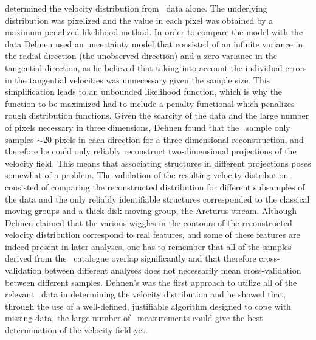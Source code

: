 \citet{1998AJ....115.2384D} determined the velocity distribution from
\Hipparcos\ data alone. The underlying distribution was pixelized and
the value in each pixel was obtained by a maximum penalized likelihood
method. In order to compare the model with the data Dehnen used an
uncertainty model that consisted of an infinite variance in the radial
direction (the unobserved direction) and a zero variance in the
tangential direction, as he believed that taking into account the
individual errors in the tangential velocities was unnecessary given
the sample size. This simplification leads to an unbounded likelihood
function, which is why the function to be maximized had to include a
penalty functional which penalizes rough distribution functions. Given
the scarcity of the data and the large number of pixels necessary in
three dimensions, Dehnen found that the \Hipparcos\ sample only
samples $\sim\!20$ pixels in each direction for a three-dimensional
reconstruction, and therefore he could only reliably reconstruct
two-dimensional projections of the velocity field. This means that
associating structures in different projections poses somewhat of a
problem. The validation of the resulting velocity distribution
consisted of comparing the reconstructed distribution for different
subsamples of the data and the only reliably identifiable structures
corresponded to the classical moving groups and a thick disk moving
group, the Arcturus stream. Although Dehnen claimed that the various
wiggles in the contours of the reconstructed velocity distribution
correspond to real features, and some of these features are indeed
present in later analyses, one has to remember that all of the samples
derived from the \Hipparcos\ catalogue overlap significantly and that
therefore cross-validation between different analyses does not
necessarily mean cross-validation between different samples. Dehnen's
was the first approach to utilize all of the relevant \Hipparcos\ data
in determining the velocity distribution and he showed that, through
the use of a well-defined, justifiable algorithm designed to cope with
missing data, the large number of \Hipparcos\ measurements could give
the best determination of the velocity field yet.

